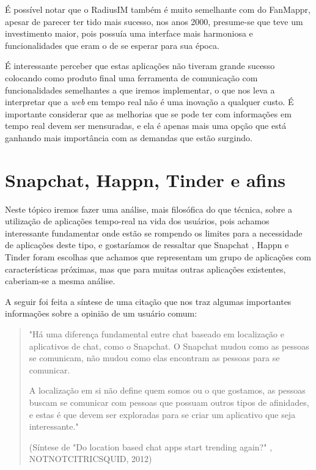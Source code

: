 É possível notar que o RadiusIM também é muito semelhante com do FanMappr, apesar de parecer ter tido mais sucesso, nos anos 2000, presume-se que teve um investimento maior, pois possuía uma interface mais harmoniosa e funcionalidades que eram o de se esperar para sua época.

É interessante perceber que estas aplicações não tiveram grande sucesso colocando como produto final uma ferramenta de comunicação com funcionalidades semelhantes a que iremos implementar, o que nos leva a interpretar que a \textit{web} em tempo real não é uma inovação a qualquer custo. É importante considerar que as melhorias que se pode ter com informações em tempo real devem ser mensuradas, e ela é apenas mais uma opção que está ganhando mais importância com as demandas que estão surgindo.

\section{Snapchat, Happn, Tinder e afins}
Neste tópico iremos fazer uma análise, mais filosófica do que técnica, sobre a utilização de aplicações tempo-real na vida dos usuários, pois achamos interessante fundamentar onde estão se rompendo os limites para a necessidade de aplicações deste tipo, e gostaríamos de ressaltar que Snapchat \cite{snapchat}, Happn \cite{happn} e Tinder \cite{tinder} foram escolhas que achamos que representam um grupo de aplicações com características próximas, mas que para muitas outras aplicações existentes, caberiam-se a mesma análise.

A seguir foi feita a síntese de uma citação \cite{notnotcitricsquid} que nos traz algumas importantes informações sobre a opinião de um usuário comum:

\begin{quote}
	\small "Há uma diferença fundamental entre chat baseado em localização e aplicativos de chat, como o Snapchat. O Snapchat mudou como as pessoas se comunicam, não mudou como elas encontram as pessoas para se comunicar.
	
	A localização em si não define quem somos ou o que gostamos, as pessoas buscam se comunicar com pessoas que possuam outros tipos de afinidades, e estas é que devem ser exploradas para se criar um aplicativo que seja interessante." 
	
	(Síntese de "Do location based chat apps start trending again?" \cite{notnotcitricsquid}, NOTNOTCITRICSQUID, 2012)
\end{quote}

